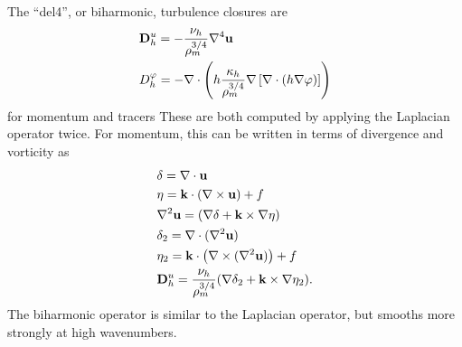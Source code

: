 The ``del4'', or biharmonic, turbulence closures are
\begin{eqnarray}
\label{ocean:\mode_h_mom_del4}
& {\bf D}^u_h=-\displaystyle\frac{\nu_h}{\rho_m^{3/4}} \nabla^4 {\bf u} \\
\label{ocean:\mode_h_tr_del4}
& D^\varphi_h = -\nabla\cdot\left(h \displaystyle\frac{\kappa_h}{\rho_m^{3/4}} \nabla \left[\nabla\cdot\left(h \nabla\varphi \right) \right] \right)
\end{eqnarray}
for momentum and tracers  These are both computed by applying the Laplacian operator twice.  For momentum, this can be written in terms of divergence and vorticity as
\begin{eqnarray}
&\delta=\nabla\cdot{\bf u}\\
&\eta={\bf k} \cdot \left( \nabla \times {\bf u} \right)+f\\
\label{ocean:\mode_h_mom_del4a}
&\nabla^2{\bf u}=(\nabla \delta + {\bf k}\times \nabla \eta) \\
&\delta_2=\nabla\cdot(\nabla^2{\bf u})\\
&\eta_2={\bf k} \cdot \left( \nabla \times (\nabla^2{\bf u}) \right)+f\\
\label{ocean:\mode_h_mom_del4b}
& {\bf D}^u_h= \displaystyle\frac{\nu_h}{\rho_m^{3/4}} (\nabla \delta_2 + {\bf k}\times \nabla \eta_2).
\end{eqnarray}
The biharmonic operator is similar to the Laplacian operator, but smooths more strongly at high wavenumbers.  
